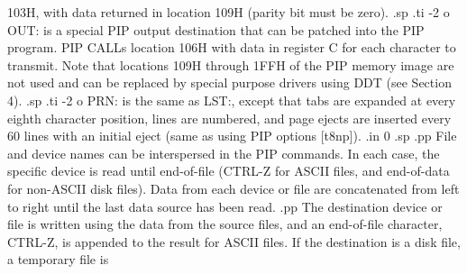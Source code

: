 103H, with data returned in location 109H (parity bit must be zero).
.sp
.ti -2
o OUT: is a special PIP output destination that can be patched into the
PIP program.  PIP CALLs location 106H with data in register C for each
character to transmit.  Note that locations 109H through
1FFH of the PIP memory image are not used and can be replaced by special
purpose drivers using DDT (see Section 4).
.sp
.ti -2
o PRN: is the same as LST:, except that tabs are expanded at every eighth
character position, lines are numbered, and page ejects are inserted every
60 lines with an initial eject (same as using PIP options [t8np]).
.in 0
.sp
.pp
File and device names can be interspersed in the PIP commands.  In each case,
the specific device is read until end-of-file (CTRL-Z for ASCII files, and
end-of-data for non-ASCII disk files).  Data from each device or file are
concatenated from left to right until the last data source has been read.
.pp
The destination device or file is written using the data from the source
files, and an end-of-file character, CTRL-Z, is appended to the result
for ASCII files.  If the destination is a disk file, a temporary file is
